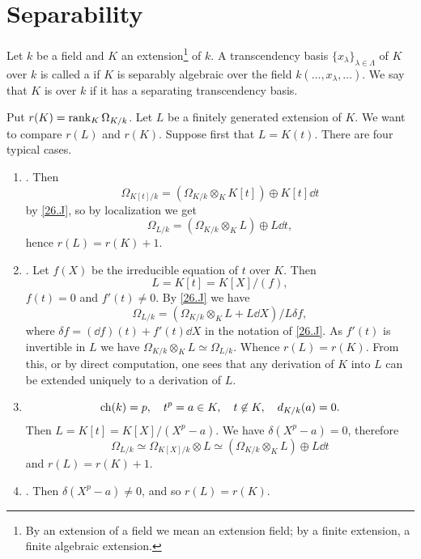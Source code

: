 \documentclass[../main]{subfiles}
\begin{document}
\section{Separability}\label{sec:27}

\newparagraph Let $k$ be a field and $K$ an extension\footnote{By an extension of a field we mean an extension field; by a finite extension, a finite algebraic extension.} of $k$. A transcendency basis $\{x_\lambda\}_{\lambda \in \Lambda}$ of $K$ over $k$ is called a  if $K$ is separably algebraic over the field $k(\ldots, x_\lambda, \ldots)$. We say that $K$ is  over $k$ if it has a separating transcendency basis.

Put $r(K) = \operatorname{rank}_K \Omega_{K/k}$. Let $L$ be a finitely generated extension of $K$. We want to compare $r(L)$ and $r(K)$. Suppose first that $L = K(t)$. There are four typical cases.
\begin{enumerate}[label = Case \arabic*.]
    \item {}. Then \[\Omega_{K[t]/k} = (\Omega_{K/k} \otimes_K K[t]) \oplus K[t] \dd t\] by \ref{26.J}, so by localization we get \[\Omega_{L/k} = (\Omega_{K/k} \otimes_K L) \oplus L \dd t,\] hence $r(L) = r(K) + 1$.
    \item  {}. Let $f(X)$ be the irreducible equation of $t$ over $K$. Then \[L = K[t] = K[X]/(f),\] $f(t) = 0$ and $f'(t) \ne 0$. By \ref{26.J} we have \[\Omega_{L/k} = (\Omega_{K/k} \otimes_K L + L \dd X)/L \delta f,\] where $\delta f = (\dd f)(t) + f'(t) \dd X$ in the notation of \ref{26.J}. As $f'(t)$ is invertible in $L$ we have $\Omega_{K/k} \otimes_K L \simeq \Omega_{L/k}$. Whence $r(L) = r(K)$. From this, or by direct computation, one sees that any derivation of $K$ into $L$ can be extended uniquely to a derivation of $L$.
    \item \[\operatorname{ch}(k) = p,\quad t^p = a \in K,\quad t \not \in K,\quad d_{K/k}(a) = 0.\] Then $L = K[t] = K[X]/(X^p - a)$. We have $\delta(X^p - a) = 0$, therefore \[\Omega_{L/k} \simeq \Omega_{K[X]/k} \otimes L \simeq (\Omega_{K/k} \otimes_K L) \oplus L \dd t\]and $r(L) = r(K) + 1$.
    \item {}. Then \newline $\delta(X^p - a) \ne 0$, and so $r(L) = r(K)$.
\end{enumerate}
\end{document}
